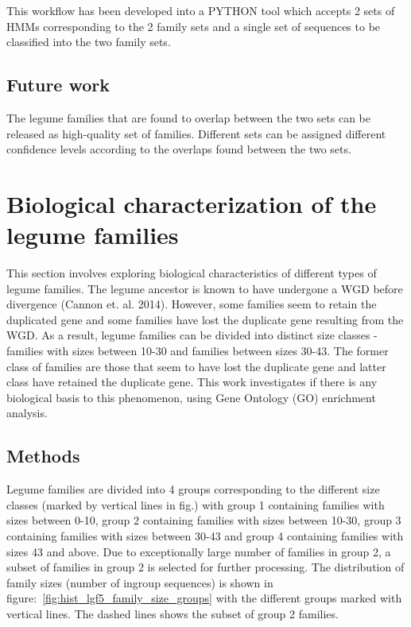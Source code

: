 \documentclass{article}
\begin{document}
		This workflow has been developed into a PYTHON tool which accepts 2 sets of HMMs corresponding to the 2 family sets and a single set of sequences to be classified into the two family sets.
		
		\subsection{Future work}
		The legume families that are found to overlap between the two sets can be released as high-quality set of families. Different sets can be assigned different confidence levels according to the overlaps found between the two sets.
	
	\pagebreak
	\section{Biological characterization of the legume families}
	This section involves exploring biological characteristics of different types of legume families. The legume ancestor is known to have undergone a WGD before divergence (Cannon et. al. 2014).  However, some families seem to retain the duplicated gene and some families have lost the duplicate gene resulting from the WGD. As a result, legume families can be divided into distinct size classes - families with sizes between 10-30 and families between sizes 30-43. The former class of families are those that seem to have lost the duplicate gene and latter class have retained the duplicate gene. This work investigates if there is any biological basis to this phenomenon, using Gene Ontology (GO) enrichment analysis. 
	
		\subsection{Methods}
		Legume families are divided into 4 groups corresponding to the different size classes (marked by vertical lines in fig.) with group 1 containing families with sizes between 0-10, group 2 containing families with sizes between 10-30, group 3 containing families with sizes between 30-43 and group 4 containing families with sizes 43 and above. Due to exceptionally large number of families in group 2, a subset of families in group 2 is selected for further processing. The distribution of family sizes (number of ingroup sequences) is shown in figure:~\ref{fig:hist_lgf5_family_size_groups} with the different groups marked with vertical lines. The dashed lines shows the subset of group 2 families.
		
\end{document}
